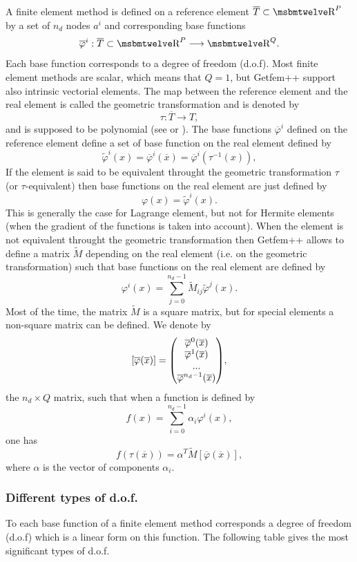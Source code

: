 \documentclass[11pt,a4paper]{article}
\begin{document}
A finite element method is defined on a reference element $\overline{T} \subset \Reel^P$ by a set of $n_d$ nodes $a^i$ and corresponding base functions 
$$ \overline{\varphi}^i : \overline{T} \subset \Reel^P \longrightarrow \Reel^Q. $$
Each base function corresponds to a degree of freedom (d.o.f).
Most finite element methods are scalar, which means that $Q = 1$, but {\sc Getfem++} support also intrinsic vectorial elements. The map between the reference element and the real element is called the geometric transformation and is denoted by 
$$ \tau :  \overline{T} \longrightarrow T, $$
and is supposed to be polynomial (see \cite{dh-to1984} or \cite{BAS_COMP}). The base functions $\overline{\varphi}^i$ defined on the reference element define a set of base function on the real element defined by
$$ \tilde{\varphi}^i(x) = \overline{\varphi}^i(\overline{x}) = \overline{\varphi}^i(\tau^{-1}(x)), $$
If the element is said to be equivalent throught the geometric transformation $\tau$ (or $\tau$-equivalent) then base functions on the real element are just defined by
$$\varphi(x) = \tilde{\varphi}^i(x).$$
This is generally the case for Lagrange element, but not for Hermite elements (when the gradient of the functions is taken into account). When the element is not equivalent throught the geometric transformation then {\sc Getfem++} allows to define a matrix $\tilde{M}$ depending on the real element (i.e. on the geometric transformation) such that base functions on the real element are defined by
$$ \varphi^i(x) = \sum_{j = 0}^{n_d - 1} \tilde{M}_{ij} \tilde{\varphi}^j(x). $$
Most of the time, the matrix $\tilde{M}$ is a square matrix, but for special elements a non-square matrix can be defined.
We denote by
$$ [\overline{\varphi}(\overline{x})] = {\left(\hspace{-.5em}\begin{array}{c} {\overline{\varphi}^0(\overline{x})} \\ {\overline{\varphi}^1(\overline{x})} \\ {...} \\ {\overline{\varphi}^{n_d-1}(\overline{x})} \end{array}\hspace{-.5em}\right)}, $$
the $n_d \times Q$ matrix, such that when a function is defined by
$$ f(x) = \sum_{i = 0}^{n_d - 1} \alpha_i \varphi^i(x), $$
one has
$$ \hspace{1em} f(\tau(\overline{x})) = \alpha^T \tilde{M} [\overline{\varphi}(\overline{x})],\hspace{1em} $$
where $\alpha$ is the vector of components $\alpha_i$.

\subsubsection{Different types of d.o.f.}

To each base function of a finite element method corresponds a degree of freedom (d.o.f) which is a linear form on this function. The following table gives the most significant types of d.o.f.\\
\end{document}
